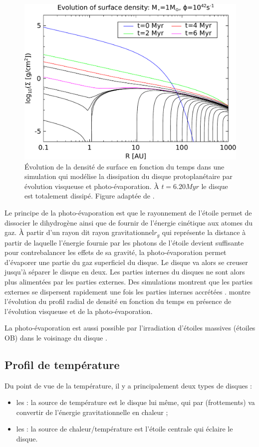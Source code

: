 \begin{figure}[htbp]
\centering
\includegraphics[width=0.65\linewidth]{figure/disk_dispersion.pdf}
\caption{Évolution de la densité de surface en fonction du temps dans une simulation qui modélise la dissipation du disque protoplanétaire par évolution visqueuse et photo-évaporation. À $t=6.20\unit{Myr}$ le disque est totalement dissipé. Figure adaptée de \cite{alexander2006photoevaporation}.}\label{fig:disk_dispersion}
\end{figure}

Le principe de la photo-évaporation est que le rayonnement de l'étoile permet de dissocier le dihydrogène ainsi que de fournir de l'énergie cinétique aux atomes du gaz. À partir d'un rayon dit \og rayon gravitationnel\fg $r_g$ qui représente la distance à partir de laquelle l'énergie fournie par les photons de l'étoile devient suffisante pour contrebalancer les effets de sa gravité, la photo-évaporation permet d'évaporer une partie du gaz superficiel du disque. Le disque va alors se creuser jusqu'à séparer le disque en deux. Les parties internes du disques ne sont alors plus alimentées par les parties externes. Des simulations montrent que les parties externes se dispersent rapidement une fois les parties internes accrétées \citep{alexander2006photoevaporation}.  montre l'évolution du profil radial de densité en fonction du temps en présence de l'évolution visqueuse et de la photo-évaporation.

La photo-évaporation est aussi possible par l'irradiation d'étoiles massives (étoiles OB) dans le voisinage du disque \citep{adams2004photoevaporation}.

\subsection{Profil de température}
Du point de vue de la température, il y a principalement deux types de disques : 
\begin{itemize}
\item les  : la source de température est le disque lui même, qui par  (frottements) va convertir de l'énergie gravitationnelle en chaleur ;
\item les  : la source de chaleur/température est l'étoile centrale qui éclaire le disque. 
\end{itemize}

